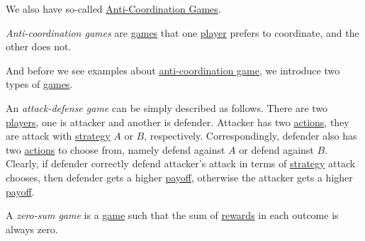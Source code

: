 We also have so-called \hyperref[def:anti-coordination-game]{Anti-Coordination Games}.
\begin{definition}\label{def:anti-coordination-game}
	\emph{Anti-coordination games} are \hyperref[def:game]{games} that one \hyperref[def:player]{player} prefers to coordinate, and the other does not.
\end{definition}

And before we see examples about \hyperref[def:anti-coordination-game]{anti-coordination game}, we introduce two types of \hyperref[def:game]{games}.

\begin{definition}\label{def:attach-defense-game}
	An \emph{attack-defense game} can be simply described as follows. There are two \hyperref[def:players]{players}, one is attacker and another is defender.
	Attacker has two \hyperref[def:strategy]{actions}, they are attack with \hyperref[def:strategy]{strategy} \(A\) or \(B\), respectively.
	Correspondingly, defender also has two \hyperref[def:strategy]{actions} to choose from, namely defend against \(A\) or defend against \(B\). Clearly,
	if defender correctly defend attacker's attack in terms of \hyperref[def:strategy]{strategy} attack chooses, then defender gets a higher \hyperref[def:reward]{payoff},
	otherwise the attacker gets a higher \hyperref[def:reward]{payoff}.
\end{definition}

\begin{definition}\label{def:zero-sum-game}
	A \emph{zero-sum game} is a \hyperref[def:game]{game} such that the sum of \hyperref[def:reward]{rewards} in each outcome is always zero.
\end{definition}

